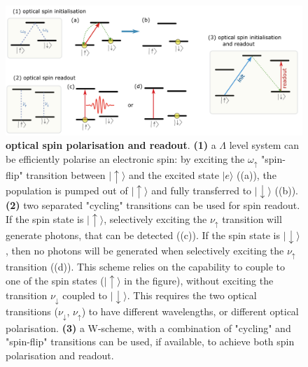 \documentclass[a4paper,11pt]{article}
\newcommand{\ket}[1]{| #1 \rangle}
\begin{document}
\begin{figure}[h]
    \centering
    \includegraphics[width =1\textwidth]{figures/optical_spin_init_RO.png}
    \caption{{\bf optical spin polarisation and readout}. {\bf (1)} a $\Lambda$ level system can be efficiently polarise an electronic spin: by exciting the $\omega_{\uparrow}$ "spin-flip" transition between $\ket{\uparrow}$ and the excited state $\ket{e}$ ((a)), the population is pumped out of $\ket{\uparrow}$ and fully transferred to $\ket{\downarrow}$ ((b)). {\bf (2)} two separated "cycling" transitions can be used for spin readout. If the spin state is $\ket{\uparrow}$, selectively exciting the $\nu_{\uparrow}$ transition will generate photons, that can be detected ((c)). If the spin state is $\ket{\downarrow}$, then no photons will be generated when selectively exciting the $\nu_{\uparrow}$ transition ((d)). This scheme relies on the capability to couple to one of the spin states ($\ket{\uparrow}$ in the figure), without exciting the transition $\nu_{\downarrow}$ coupled to $\ket{\downarrow}$. This requires the two optical transitions ($\nu_{\downarrow}$, $\nu_{\uparrow}$) to have different wavelengths, or different optical polarisation. {\bf (3)} a W-scheme, with a combination of "cycling" and "spin-flip" transitions can be used, if available, to achieve both spin polarisation and readout.}
    \label{fig:optical_init_RO}
\end{figure}
\end{document}
